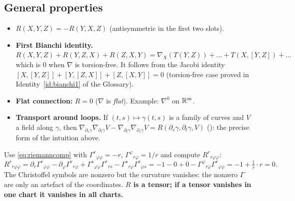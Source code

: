 \subsection{General properties}
\begin{itemize}[nosep]
\item $R(X,Y,Z)=-R(Y,X,Z)$ (antisymmetric in the first two slots).
\item \textbf{First Bianchi identity.} $R(X,Y,Z)+R(Y,Z,X)+R(Z,X,Y)=\nabla_X(T(Y,Z))+\dots+T(X,[Y,Z])+\dots$ which is $0$ when $\nabla$ is torsion-free. It follows from the Jacobi identity $[X,[Y,Z]]+[Y,[Z,X]]+[Z,[X,Y]]=0$ (torsion-free case proved in Identity~\ref{id:bianchi1} of the Glossary).%
\item \textbf{Flat connection:} $R=0$ ($\nabla$ is \emph{flat}). Example: $\nabla^0$ on $\mathbb{R}^m$.
\item \textbf{Transport around loops.} If $(t,s)\mapsto\gamma(t,s)$ is a family of curves and $V$ a field along $\gamma$, then $\nabla_{\partial_s\gamma}\nabla_{\partial_t\gamma}V-\nabla_{\partial_t\gamma}\nabla_{\partial_s\gamma}V=R(\partial_s\gamma,\partial_t\gamma,V)$ (\cite[Prop.~7.5]{Lee}): the precise form of the intuition above.
\end{itemize}

\begin{example}
Use \eqref{eq:riemanncomp} with $\Gamma^r{}_{\varphi\varphi}=-r$, $\Gamma^\varphi{}_{r\varphi}=1/r$ and compute $R^r{}_{r\varphi\varphi}$:
\[
R^r{}_{r\varphi\varphi}=\partial_r\Gamma^r{}_{\varphi\varphi}-\partial_\varphi\Gamma^r{}_{r\varphi}+\Gamma^s{}_{\varphi\varphi}\Gamma^r{}_{rs}-\Gamma^s{}_{r\varphi}\Gamma^r{}_{\varphi s}
=-1-0+0-\Gamma^\varphi{}_{r\varphi}\Gamma^r{}_{\varphi\varphi}=-1+\tfrac1r\cdot r=0 .
\]
The Christoffel symbols are nonzero but the curvature vanishes: the nonzero $\Gamma$ are only an artefact of the coordinates. \textbf{$R$ is a tensor; if a tensor vanishes in one chart it vanishes in all charts.}
\end{example}

